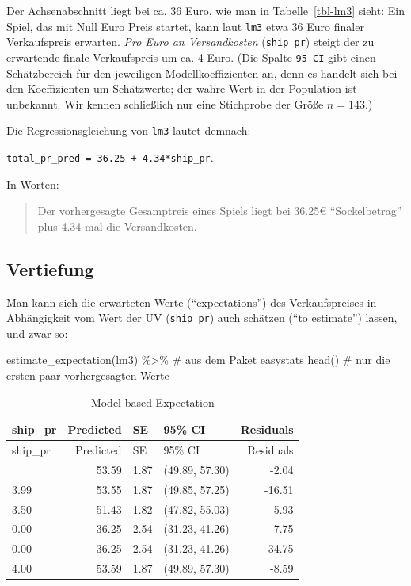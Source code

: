 \documentclass[
  letterpaper,
]{scrbook}
\newenvironment{Shaded}{\begin{snugshade}}{\end{snugshade}}
\newcommand{\CommentTok}[1]{\textcolor[rgb]{0.37,0.37,0.37}{#1}}
\newcommand{\FunctionTok}[1]{\textcolor[rgb]{0.28,0.35,0.67}{#1}}
\newcommand{\NormalTok}[1]{\textcolor[rgb]{0.00,0.23,0.31}{#1}}
\newcommand{\SpecialCharTok}[1]{\textcolor[rgb]{0.37,0.37,0.37}{#1}}
\theoremstyle{definition}
\theoremstyle{definition}
\theoremstyle{definition}
\theoremstyle{remark}
\begin{document}
Der Achsenabschnitt liegt bei ca. 36 Euro, wie man in
Tabelle~\ref{tbl-lm3} sieht: Ein Spiel, das mit Null Euro Preis startet,
kann laut \texttt{lm3} etwa 36 Euro finaler Verkaufspreis erwarten.
\emph{Pro Euro an Versandkosten} (\texttt{ship\_pr}) steigt der zu
erwartende finale Verkaufspreis um ca. 4 Euro. (Die Spalte
\texttt{95\ CI} gibt einen Schätzbereich für den jeweiligen
Modellkoeffizienten an, denn es handelt sich bei den Koeffizienten um
Schätzwerte; der wahre Wert in der Population ist unbekannt. Wir kennen
schließlich nur eine Stichprobe der Größe \(n=143\).)

Die Regressionsgleichung von \texttt{lm3} lautet demnach:

\texttt{total\_pr\_pred\ =\ 36.25\ +\ 4.34*ship\_pr}.

In Worten:

\begin{quote}
Der vorhergesagte Gesamptreis eines Spiels liegt bei 36.25€
``Sockelbetrag'' plus 4.34 mal die Versandkosten.
\end{quote}

\subsection{Vertiefung}\label{vertiefung-6}

Man kann sich die erwarteten Werte (``expectations'') des
Verkaufspreises in Abhängigkeit vom Wert der UV (\texttt{ship\_pr}) auch
schätzen (``to estimate'') lassen, und zwar so:

\begin{Shaded}
\begin{Highlighting}[]
\FunctionTok{estimate\_expectation}\NormalTok{(lm3) }\SpecialCharTok{\%\textgreater{}\%}  \CommentTok{\# aus dem Paket \textquotesingle{}easystats\textquotesingle{}}
  \FunctionTok{head}\NormalTok{()  }\CommentTok{\# nur die ersten paar vorhergesagten Werte}
\end{Highlighting}
\end{Shaded}

\begin{longtable}[]{@{}lrllr@{}}
\caption{Model-based Expectation}\tabularnewline
\toprule\noalign{}
ship\_pr & Predicted & SE & 95\% CI & Residuals \\
\midrule\noalign{}
\endfirsthead
\toprule\noalign{}
ship\_pr & Predicted & SE & 95\% CI & Residuals \\
\midrule\noalign{}
\endhead
\bottomrule\noalign{}
\endlastfoot
4.00 & 53.59 & 1.87 & (49.89, 57.30) & -2.04 \\
3.99 & 53.55 & 1.87 & (49.85, 57.25) & -16.51 \\
3.50 & 51.43 & 1.82 & (47.82, 55.03) & -5.93 \\
0.00 & 36.25 & 2.54 & (31.23, 41.26) & 7.75 \\
0.00 & 36.25 & 2.54 & (31.23, 41.26) & 34.75 \\
4.00 & 53.59 & 1.87 & (49.89, 57.30) & -8.59 \\
\end{longtable}
\end{document}
